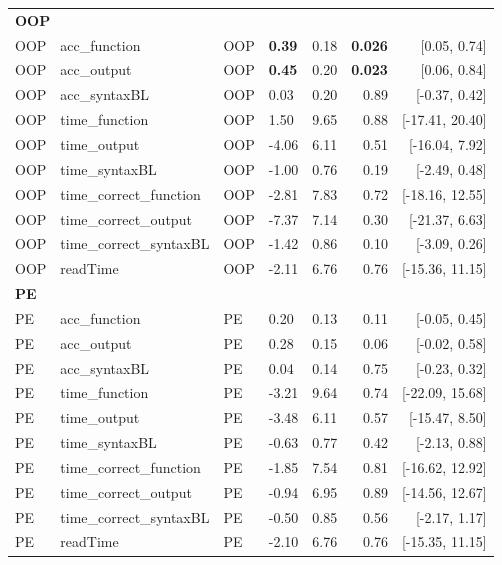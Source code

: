 \begin{table}[t]
\begin{tabular}{llllrrr}
\midrule

\multicolumn{7}{l}{\textbf{OOP}} \\
OOP & acc\_function & OOP & \textbf{0.39} & 0.18 & \textbf{0.026} & [0.05, 0.74] \\
OOP & acc\_output & OOP & \textbf{0.45} & 0.20 & \textbf{0.023} & [0.06, 0.84] \\
OOP & acc\_syntaxBL & OOP & 0.03 & 0.20 & 0.89 & [-0.37, 0.42] \\
OOP & time\_function & OOP & 1.50 & 9.65 & 0.88 & [-17.41, 20.40] \\
OOP & time\_output & OOP & -4.06 & 6.11 & 0.51 & [-16.04, 7.92] \\
OOP & time\_syntaxBL & OOP & -1.00 & 0.76 & 0.19 & [-2.49, 0.48] \\
OOP & time\_correct\_function & OOP & -2.81 & 7.83 & 0.72 & [-18.16, 12.55] \\
OOP & time\_correct\_output & OOP & -7.37 & 7.14 & 0.30 & [-21.37, 6.63] \\
OOP & time\_correct\_syntaxBL & OOP & -1.42 & 0.86 & 0.10 & [-3.09, 0.26] \\
OOP & readTime & OOP & -2.11 & 6.76 & 0.76 & [-15.36, 11.15] \\

\midrule

\multicolumn{7}{l}{\textbf{PE}} \\
PE & acc\_function & PE & 0.20 & 0.13 & 0.11 & [-0.05, 0.45] \\
PE & acc\_output & PE & 0.28 & 0.15 & 0.06 & [-0.02, 0.58] \\
PE & acc\_syntaxBL & PE & 0.04 & 0.14 & 0.75 & [-0.23, 0.32] \\
PE & time\_function & PE & -3.21 & 9.64 & 0.74 & [-22.09, 15.68] \\
PE & time\_output & PE & -3.48 & 6.11 & 0.57 & [-15.47, 8.50] \\
PE & time\_syntaxBL & PE & -0.63 & 0.77 & 0.42 & [-2.13, 0.88] \\
PE & time\_correct\_function & PE & -1.85 & 7.54 & 0.81 & [-16.62, 12.92] \\
PE & time\_correct\_output & PE & -0.94 & 6.95 & 0.89 & [-14.56, 12.67] \\
PE & time\_correct\_syntaxBL & PE & -0.50 & 0.85 & 0.56 & [-2.17, 1.17] \\
PE & readTime & PE & -2.10 & 6.76 & 0.76 & [-15.35, 11.15] \\

\midrule


\end{tabular}
\end{table}
